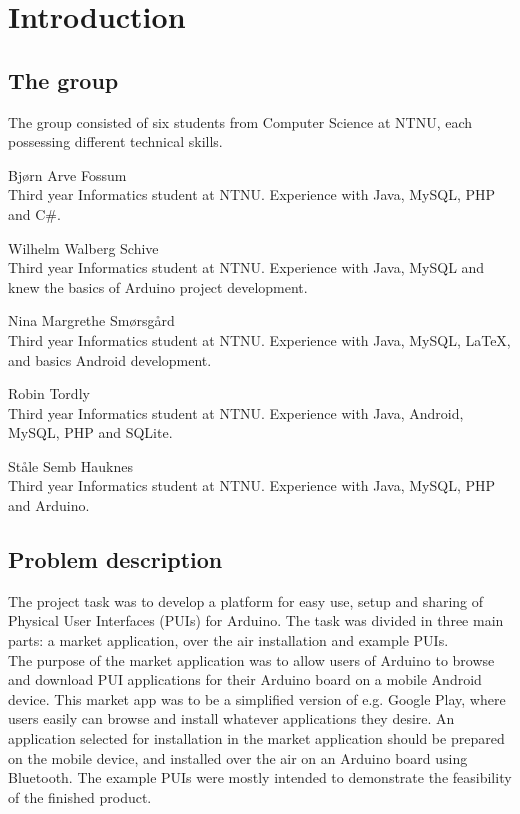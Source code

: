 \chapter{Introduction}
\section{The group}
The group consisted of six students from Computer Science at NTNU, each possessing different technical skills.

\begin{description}
\item{Bjørn Arve Fossum}\hfill \\
	Third year Informatics student at NTNU. Experience with Java, MySQL, PHP and C\#.
\item{Wilhelm Walberg Schive}\hfill \\
	Third year Informatics student at NTNU. Experience with Java, MySQL and knew the basics of Arduino project development.
\item{Nina Margrethe Smørsgård}\hfill \\
	Third year Informatics student at NTNU. Experience with Java, MySQL, \LaTeX, and basics Android development.
\item{Robin Tordly}\hfill \\
	Third year Informatics student at NTNU. Experience with Java, Android, MySQL, PHP and SQLite. 
\item{Ståle Semb Hauknes}\hfill \\
	Third year Informatics student at NTNU. Experience with Java, MySQL, PHP and Arduino.
\end{description}

\section{Problem description}
The project task was to develop a platform for easy use, setup and sharing of Physical User Interfaces (PUIs) for Arduino. The task was divided in three main parts: a market application, over the air installation and example PUIs.\\
\newline
The purpose of the market application was to allow users of Arduino to browse and download PUI applications for their Arduino board on a mobile Android device. This market app was to be a simplified version of e.g. Google Play, where users easily can browse and install whatever applications they desire. An application selected for installation in the market application should be prepared on the mobile device, and installed over the air on an Arduino board using Bluetooth. The example PUIs were mostly intended to demonstrate the feasibility of the finished product.

